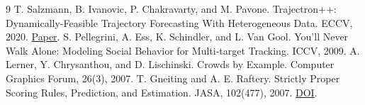 \documentclass[11pt]{article}
\begin{document}
\begin{thebibliography}{9}
\small
\setlength{\itemsep}{0pt}
 T. Salzmann, B. Ivanovic, P. Chakravarty, and M. Pavone.
Trajectron++: Dynamically-Feasible Trajectory Forecasting With Heterogeneous
Data. ECCV, 2020. \href{https://arxiv.org/abs/2001.03093}{Paper}.
 S. Pellegrini, A. Ess, K. Schindler, and L. Van Gool.
You'll Never Walk Alone: Modeling Social Behavior for Multi-target Tracking.
ICCV, 2009.
 A. Lerner, Y. Chrysanthou, and D. Lischinski. Crowds by
Example. Computer Graphics Forum, 26(3), 2007.
 T. Gneiting and A. E. Raftery. Strictly Proper Scoring Rules,
Prediction, and Estimation. JASA, 102(477), 2007.
\href{https://doi.org/10.1198/016214506000001437}{DOI}.
\end{thebibliography}
\end{document}
